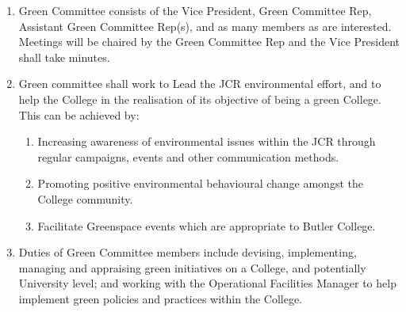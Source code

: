 
\begin{enumerate}
    \item Green Committee consists of the Vice President, Green Committee Rep, Assistant Green Committee Rep(s), and as many members as are interested. Meetings will be chaired by the Green Committee Rep and the Vice President shall take minutes.
    \item Green committee shall work to Lead the JCR environmental effort, and to help the College in the realisation of its objective of being a green College. This can be achieved by:
    \begin{enumerate}
        \item Increasing awareness of environmental issues within the JCR through regular campaigns, events and other communication methods.
        \item Promoting positive environmental behavioural change amongst the College community.
        \item Facilitate Greenspace events which are appropriate to Butler College.
    \end{enumerate}
    \item Duties of Green Committee members include devising, implementing, managing and appraising green initiatives on a College, and potentially University level; and working with the Operational Facilities Manager to help implement green policies and practices within the College.

\end{enumerate}


